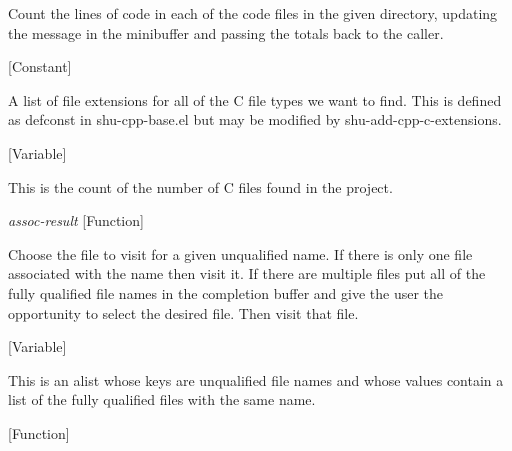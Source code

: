 \begin{doc-string}
Count the lines of code in each of the code files in the given directory, updating
the message in the minibuffer and passing the totals back to the caller.
\end{doc-string}

\vspace{1em}
\noindent
{}
\usebox{\funcname}
 \hfill [Constant]

\begin{doc-string}
A list of file extensions for all of the C file types we want to find.  This is defined
as defconst in shu-cpp-base.el but may be modified by shu-add-cpp-c-extensions.
\end{doc-string}

\vspace{1em}
\noindent
{}
\usebox{\funcname}
 \hfill [Variable]

\begin{doc-string}
This is the count of the number of C files found in the project.
\end{doc-string}

\vspace{1em}
\noindent
{}
\usebox{\funcname}\emph{assoc-result}
 \hfill [Function]

\begin{doc-string}
Choose the file to visit for a given unqualified name.  If there is
only one file associated with the name then visit it.  If there are
multiple files put all of the fully qualified file names in the completion
buffer and give the user the opportunity to select the desired file.  Then
visit that file.
\end{doc-string}

\vspace{1em}
\noindent
{}
\usebox{\funcname}
 \hfill [Variable]

\begin{doc-string}
This is an alist whose keys are unqualified file names and whose
values contain a list of the fully qualified files with the same
name.
\end{doc-string}

\vspace{1em}
\noindent
{}
\usebox{\funcname}
 \hfill [Function]

